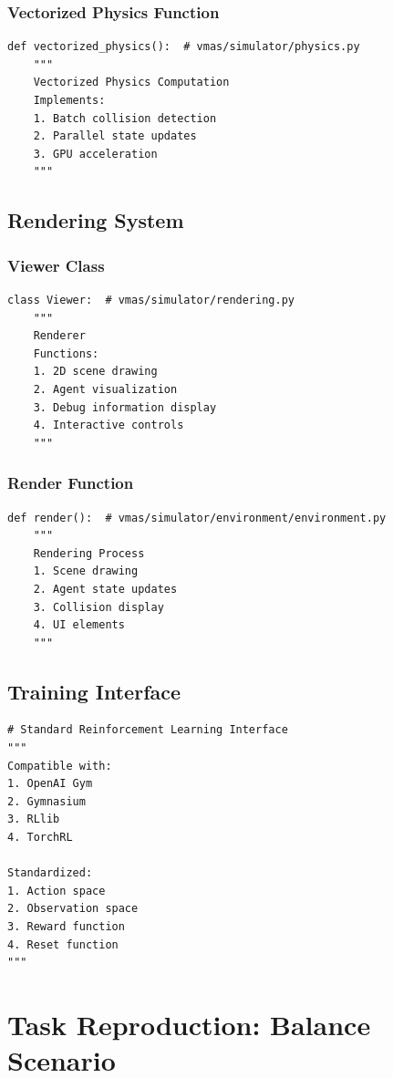 \documentclass[12pt]{article}
\begin{document}
\subsubsection{Vectorized Physics Function}
\begin{verbatim}
def vectorized_physics():  # vmas/simulator/physics.py
    """
    Vectorized Physics Computation
    Implements:
    1. Batch collision detection
    2. Parallel state updates
    3. GPU acceleration
    """
\end{verbatim}

\subsection{Rendering System}

\subsubsection{Viewer Class}
\begin{verbatim}
class Viewer:  # vmas/simulator/rendering.py
    """
    Renderer
    Functions:
    1. 2D scene drawing
    2. Agent visualization
    3. Debug information display
    4. Interactive controls
    """
\end{verbatim}

\subsubsection{Render Function}
\begin{verbatim}
def render():  # vmas/simulator/environment/environment.py
    """
    Rendering Process
    1. Scene drawing
    2. Agent state updates
    3. Collision display
    4. UI elements
    """
\end{verbatim}

\subsection{Training Interface}
\begin{verbatim}
# Standard Reinforcement Learning Interface
"""
Compatible with:
1. OpenAI Gym
2. Gymnasium
3. RLlib
4. TorchRL

Standardized:
1. Action space
2. Observation space
3. Reward function
4. Reset function
"""
\end{verbatim}

\section{Task Reproduction: Balance Scenario}
\end{document}
